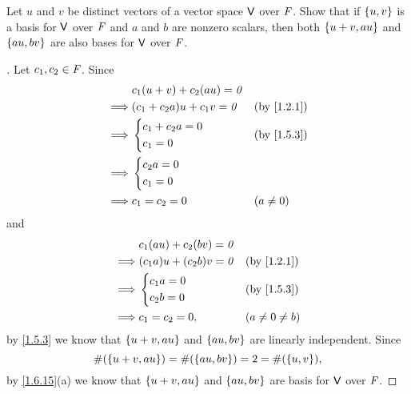 \exercisesection

\setcounter{ex}{10}
\begin{ex}\label{ex:1.6.11}
	Let \(u\) and \(v\) be distinct vectors of a vector space \(\mathsf{V}\) over \(\mathit{F}\).
	Show that if \(\left\lbrace u, v\right\rbrace\) is a basis for \(\mathsf{V}\) over \(\mathit{F}\) and \(a\) and \(b\) are nonzero scalars, then both \(\left\lbrace u + v, au\right\rbrace\) and \(\left\lbrace au, bv\right\rbrace\) are also bases for \(\mathsf{V}\) over \(\mathit{F}\).
\end{ex}

\begin{proof}[]
	Let \(c_1, c_2 \in \mathit{F}\).
	Since
	\begin{align*}
		         & c_1 (u + v) + c_2 (au) = \zv                  \\
		\implies & (c_1 + c_2 a) u + c_1 v = \zv &  & \by{1.2.1} \\
		\implies & \begin{dcases}
			           c_1 + c_2 a = 0 \\
			           c_1 = 0
		           \end{dcases}            &  & \by{1.5.3}       \\
		\implies & \begin{dcases}
			           c_2 a = 0 \\
			           c_1 = 0
		           \end{dcases}                                 \\
		\implies & c_1 = c_2 = 0                 &  & (a \neq 0)
	\end{align*}
	and
	\begin{align*}
		         & c_1 (au) + c_2 (bv) = \zv                          \\
		\implies & (c_1 a) u + (c_2 b) v = \zv &  & \by{1.2.1}        \\
		\implies & \begin{dcases}
			           c_1 a = 0 \\
			           c_2 b = 0
		           \end{dcases}              &  & \by{1.5.3}          \\
		\implies & c_1 = c_2 = 0,              &  & (a \neq 0 \neq b)
	\end{align*}
	by \cref{1.5.3} we know that \(\left\lbrace u + v, au\right\rbrace\) and \(\left\lbrace au, bv\right\rbrace\) are linearly independent.
	Since
	\[
		\#(\left\lbrace u + v, au\right\rbrace) = \#(\left\lbrace au, bv\right\rbrace) = 2 = \#(\left\lbrace u, v\right\rbrace),
	\]
	by \cref{1.6.15}(a) we know that \(\left\lbrace u + v, au\right\rbrace\) and \(\left\lbrace au, bv\right\rbrace\) are basis for \(\mathsf{V}\) over \(\mathit{F}\).
\end{proof}

